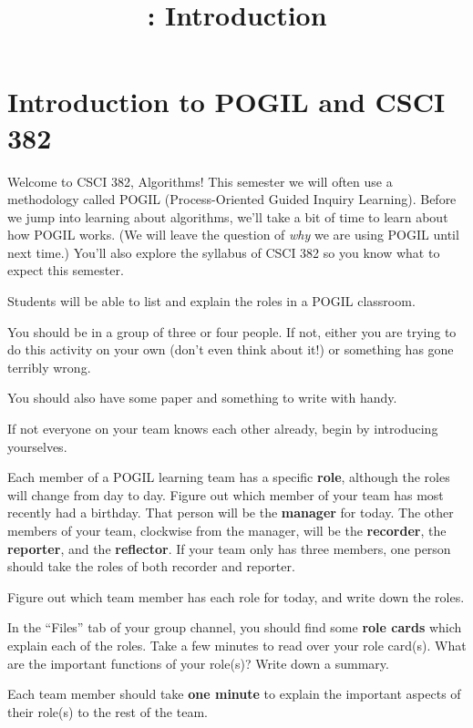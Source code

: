 \documentclass{tufte-handout}
\title{\thecourse: Introduction}
\date{}
\begin{document}
\maketitle

\section{Introduction to POGIL and CSCI 382}

Welcome to CSCI 382, Algorithms!  This semester we will often use a
methodology called POGIL (Process-Oriented Guided Inquiry
Learning). Before we jump into
learning about algorithms, we'll take a bit of time to learn about how
POGIL works. (We will leave the question of \emph{why} we are using
POGIL until next time.)  You'll also explore the syllabus of CSCI 382
so you know what to expect this semester.

\begin{objective}
  Students will be able to list and explain the roles in a POGIL
  classroom.
\end{objective}


You should be in a group of three or four people.  If not, either you
are trying to do this activity on your own (don't even think about
it!) or something has gone terribly wrong.

You should also have some paper and something to write with handy.

\begin{questions}
\item If not everyone on your team knows each other already, begin by
  introducing yourselves.
\end{questions}

Each member of a POGIL learning team has a specific \textbf{role},
although the roles will change from day to day.  Figure out which
member of your team has most recently had a birthday.  That person
will be the \textbf{manager} for today. The other members of your
team, clockwise from the manager, will be the \textbf{recorder}, the
\textbf{reporter}, and the \textbf{reflector}.  If your team only has
three members, one person should take the roles of both recorder and
reporter.

\begin{questions}
\item Figure out which team member has each role for today, and write
  down the roles.
\item
  In the ``Files'' tab of your group channel, you should find some
  \textbf{role cards} which explain each of the roles.
  Take a few minutes to read over your
  role card(s).  What are the important functions of your role(s)?
  Write down a summary.
\item Each team member should take \textbf{one minute} to explain the
  important aspects of their role(s) to the rest of the team.
\end{questions}
\end{document}
